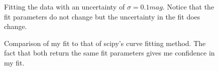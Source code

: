 \documentclass[twocolumn,11pt]{article}
\begin{document}
\begin{figure}[!h]
	\centering
	\noindent
      \caption{Fitting the data with an uncertainty of $\sigma=0.1mag$. Notice that the fit parameters do not change but the uncertainty in the fit does change.}
\end{figure}

\begin{figure}[!h]
	\centering
	\noindent
      \caption{Comparison of my fit to that of scipy's curve fitting method. The fact that both return the same fit parameters gives me confidence in my fit.}
\end{figure}
\end{document}
